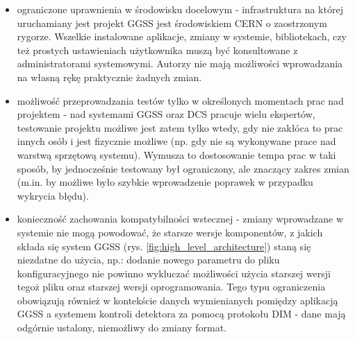 \begin{itemize}
    \item ograniczone uprawnienia w środowisku docelowym - infrastruktura na której uruchamiany jest projekt GGSS jest środowiskiem CERN o zaostrzonym rygorze. Wszelkie instalowane aplikacje, zmiany w systemie, bibliotekach, czy też prostych ustawieniach użytkownika muszą być konsultowane z administratorami systemowymi. Autorzy nie mają możliwości wprowadzania na własną rękę praktycznie żadnych zmian.
    \item możliwość przeprowadzania testów tylko w określonych momentach prac nad projektem - nad systemami GGSS oraz DCS pracuje wielu ekspertów, testowanie projektu możliwe jest zatem tylko wtedy, gdy nie zakłóca to prac innych osób i jest fizycznie możliwe (np. gdy nie są wykonywane prace nad warstwą sprzętową systemu). Wymusza to dostosowanie tempa prac w taki sposób, by jednocześnie testowany był ograniczony, ale znaczący zakres zmian (m.in. by możliwe było szybkie wprowadzenie poprawek w przypadku wykrycia błędu).
    \item konieczność zachowania kompatybilności wstecznej - zmiany wprowadzane w systemie nie mogą powodować, że starsze wersje komponentów, z jakich składa się system GGSS (rys. \ref{fig:high_level_architecture}) staną się niezdatne do użycia, np.: dodanie nowego parametru do pliku konfiguracyjnego nie powinno wykluczać możliwości użycia starszej wersji tegoż pliku oraz starszej wersji oprogramowania. Tego typu ograniczenia obowiązują również w kontekście danych wymienianych pomiędzy aplikacją GGSS a systemem kontroli detektora za pomocą protokołu DIM - dane mają odgórnie ustalony, niemożliwy do zmiany format.
\end{itemize}

